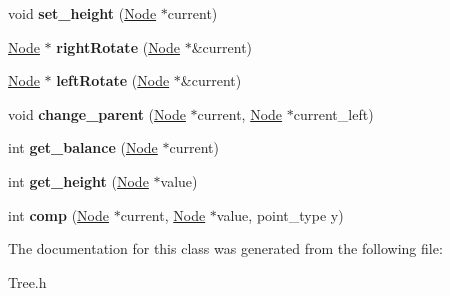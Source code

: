 \begin{DoxyCompactItemize}
\item 
\mbox{\label{class_tree_abce769295c557db47ab0417799b84b72}} 
void {\bfseries set\+\_\+height} (\mbox{\hyperlink{class_node}{Node}} $\ast$current)
\item 
\mbox{\label{class_tree_ac799faf59d1731ac520d8f1bfe7af6a9}} 
\mbox{\hyperlink{class_node}{Node}} $\ast$ {\bfseries right\+Rotate} (\mbox{\hyperlink{class_node}{Node}} $\ast$\&current)
\item 
\mbox{\label{class_tree_ae84d7ea298639ed69bf9880eef48fa14}} 
\mbox{\hyperlink{class_node}{Node}} $\ast$ {\bfseries left\+Rotate} (\mbox{\hyperlink{class_node}{Node}} $\ast$\&current)
\item 
\mbox{\label{class_tree_af39b1c41bb30930b679ce41d52a44a8a}} 
void {\bfseries change\+\_\+parent} (\mbox{\hyperlink{class_node}{Node}} $\ast$current, \mbox{\hyperlink{class_node}{Node}} $\ast$current\+\_\+left)
\item 
\mbox{\label{class_tree_a901b31ce44d97666aadcba63e277c2f7}} 
int {\bfseries get\+\_\+balance} (\mbox{\hyperlink{class_node}{Node}} $\ast$current)
\item 
\mbox{\label{class_tree_ad45c936e758c0890b6d644a4275c612d}} 
int {\bfseries get\+\_\+height} (\mbox{\hyperlink{class_node}{Node}} $\ast$value)
\item 
\mbox{\label{class_tree_afaad4fc9334c66add38c1feaaae7eae9}} 
int {\bfseries comp} (\mbox{\hyperlink{class_node}{Node}} $\ast$current, \mbox{\hyperlink{class_node}{Node}} $\ast$value, point\+\_\+type y)
\end{DoxyCompactItemize}


The documentation for this class was generated from the following file\+:\begin{DoxyCompactItemize}
\item 
Tree.\+h\end{DoxyCompactItemize}
